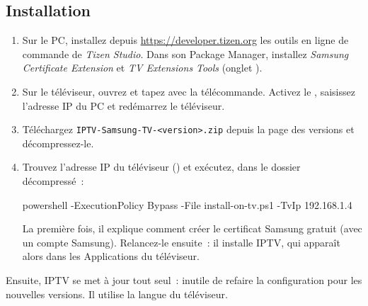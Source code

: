 \subsection{Installation}
\begin{enumerate}
  \item Sur le PC, installez depuis \url{https://developer.tizen.org} les
        outils en ligne de commande de \emph{Tizen Studio}. Dans son Package
        Manager, installez \emph{Samsung Certificate Extension} et \emph{TV
        Extensions Tools} (onglet ).
  \item Sur le téléviseur, ouvrez  et tapez
         avec la télécommande. Activez le
        , saisissez l'adresse IP du PC et redémarrez le
        téléviseur.
  \item Téléchargez \texttt{IPTV-Samsung-TV-\textless version\textgreater.zip}
        depuis la page des versions et décompressez-le.
  \item Trouvez l'adresse IP du téléviseur () et exécutez, dans le dossier décompressé~:
\begin{center}
\begin{minipage}{0.92\linewidth}
\small\ttfamily powershell -ExecutionPolicy Bypass -File install-on-tv.ps1 -TvIp 192.168.1.4
\end{minipage}
\end{center}
        La première fois, il explique comment créer le certificat Samsung
        gratuit (avec un compte Samsung). Relancez-le ensuite~: il installe
        IPTV, qui apparaît alors dans les Applications du téléviseur.
\end{enumerate}
Ensuite, IPTV se met à jour tout seul~: inutile de refaire la configuration
pour les nouvelles versions. Il utilise la langue du téléviseur.

